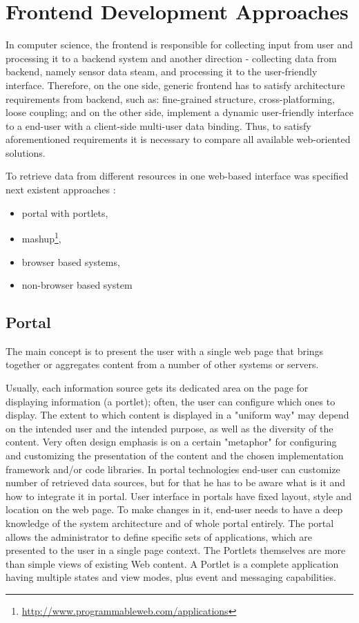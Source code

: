 \section{Frontend Development Approaches}
In computer science, the frontend is responsible for collecting input from user and processing it to a backend system and another direction - collecting data from backend, namely sensor data steam, and processing it to the user-friendly interface. Therefore, on the one side, generic frontend has to satisfy architecture requirements from backend, such as: fine-grained structure, cross-platforming, loose coupling; and on the other side, implement a dynamic user-friendly interface to a end-user with a client-side multi-user data binding. Thus, to satisfy aforementioned requirements it is necessary to compare all available web-oriented solutions.

To retrieve data from different resources in one web-based interface was specified next existent approaches :
\begin{itemize}
 \item portal with portlets,
 \item mashup\footnote{\url{http://www.programmableweb.com/applications}},
 \item browser based systems,
 \item non-browser based system
\end{itemize}

	\subsection{Portal}
		The main concept is to present the user with a single web page that brings together or aggregates content from a number of other systems or servers. 

		Usually, each information source gets its dedicated area on the page for displaying information (a portlet); often, the user can configure which ones to display. The extent to which content is displayed in a "uniform way" may depend on the intended user and the intended purpose, as well as the diversity of the content. Very often design emphasis is on a certain "metaphor" for configuring and customizing the presentation of the content and the chosen implementation framework and/or code libraries\cite{pautasso2008restful,seong2006usability}. In portal technologies end-user can customize number of retrieved data sources, but for that he has to be aware what is it and how to integrate it in portal. User interface in portals have fixed layout, style and location on the web page. To make changes in it, end-user needs to have a deep knowledge of the system architecture and of whole portal entirely. The portal allows the administrator to define specific sets of applications, which are presented to the user in a single page context. The Portlets themselves are more than simple views of existing Web content. A Portlet is a complete application having multiple states and view modes, plus event and messaging capabilities.

